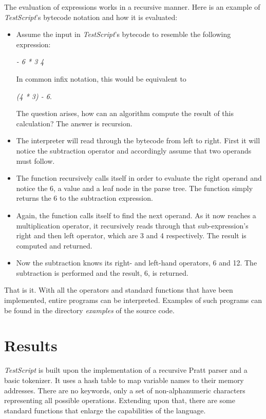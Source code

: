 \documentclass[12pt,a4paper]{article}
\newcommand{\expr}[1] {
    \begin{center}
        #1
    \end{center}
}
\newcommand{\name}{\emph{TestScript}}
\begin{document}
The evaluation of expressions works in a recursive manner. Here is an 
example of \name{}'s bytecode notation and how it is evaluated:
\begin{itemize}
    \item Assume the input in \name{}'s bytecode to resemble the following expression: 
        \expr{\emph{- 6 * 3 4}}
        In common infix notation, this would be equivalent to 
        \expr{\emph{(4 * 3) - 6}.}
        The question arises, how can an algorithm compute the result of this
        calculation? The answer is recursion.
    \item The interpreter will read through the bytecode from left to right. First it will
        notice the subtraction operator and accordingly assume that two
        operands must follow.
    \item The function recursively calls itself in order to evaluate the
        right operand and notice the 6, a value and a leaf node in the parse tree. 
        The function simply returns the 6 to the subtraction expression.
    \item Again, the function calls itself to find the next operand.
        As it now reaches a multiplication operator,
        it recursively reads through that sub-expression's right and then left
        operator, which are 3 and 4 respectively.
        The result is computed and returned.
    \item Now the subtraction knows its right- and left-hand operators, 6 and 12.
        The subtraction is performed and the result, 6, is returned.
\end{itemize}

That is it. With all the operators and standard functions that have been implemented, entire programs
can be interpreted. Examples of such programs can be found in the directory
\emph{examples} of the source code.

\section{Results}

\name{} is built upon the implementation of a recursive Pratt
parser and a basic tokenizer. It uses a hash table to map variable names to their
memory addresses. There are no keywords, only a set of non-alphanumeric characters
representing all possible operations. Extending upon that, there are some
standard functions that enlarge the capabilities of the language.
\end{document}
